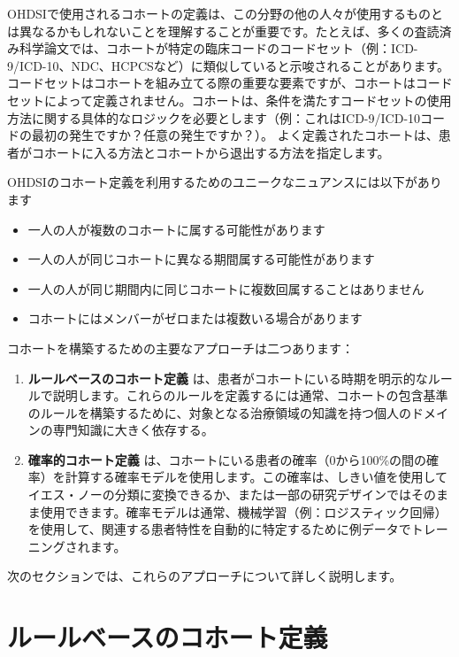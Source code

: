 \documentclass[
  11pt]{book}
\providecommand{\tightlist}{%
  \setlength{\itemsep}{0pt}\setlength{\parskip}{0pt}}
\theoremstyle{definition}
\theoremstyle{definition}
\theoremstyle{definition}
\theoremstyle{definition}
\theoremstyle{remark}
\begin{document}
  OHDSIで使用されるコホートの定義は、この分野の他の人々が使用するものとは異なるかもしれないことを理解することが重要です。たとえば、多くの査読済み科学論文では、コホートが特定の臨床コードのコードセット（例：ICD-9/ICD-10、NDC、HCPCSなど）に類似していると示唆されることがあります。コードセットはコホートを組み立てる際の重要な要素ですが、コホートはコードセットによって定義されません。コホートは、条件を満たすコードセットの使用方法に関する具体的なロジックを必要とします（例：これはICD-9/ICD-10コードの最初の発生ですか？任意の発生ですか？）。 よく定義されたコホートは、患者がコホートに入る方法とコホートから退出する方法を指定します。 

 OHDSIのコホート定義を利用するためのユニークなニュアンスには以下があります

\begin{itemize}
\tightlist
\item
  一人の人が複数のコホートに属する可能性があります
\item
  一人の人が同じコホートに異なる期間属する可能性があります
\item
  一人の人が同じ期間内に同じコホートに複数回属することはありません
\item
  コホートにはメンバーがゼロまたは複数いる場合があります
\end{itemize}

コホートを構築するための主要なアプローチは二つあります：

\begin{enumerate}
\def\labelenumi{\arabic{enumi}.}
\item
  \textbf{ルールベースのコホート定義} は、患者がコホートにいる時期を明示的なルールで説明します。これらのルールを定義するには通常、コホートの包含基準のルールを構築するために、対象となる治療領域の知識を持つ個人のドメインの専門知識に大きく依存する。
\item
  \textbf{確率的コホート定義} は、コホートにいる患者の確率（0から100\%の間の確率）を計算する確率モデルを使用します。この確率は、しきい値を使用してイエス・ノーの分類に変換できるか、または一部の研究デザインではそのまま使用できます。確率モデルは通常、機械学習（例：ロジスティック回帰）を使用して、関連する患者特性を自動的に特定するために例データでトレーニングされます。
\end{enumerate}

次のセクションでは、これらのアプローチについて詳しく説明します。

\section{ルールベースのコホート定義}\label{ux30ebux30fcux30ebux30d9ux30fcux30b9ux306eux30b3ux30dbux30fcux30c8ux5b9aux7fa9}
\end{document}

